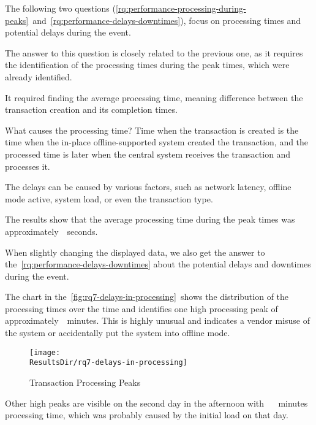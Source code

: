 The following two questions (\autoref{rq:performance-processing-during-peaks}~and~\autoref{rq:performance-delays-downtimes}), focus on processing times and potential delays during the event.


The answer to this question is closely related to the previous one, as it requires the identification of the processing times during the peak times, which were already identified.

It required finding the average processing time, meaning difference between the transaction creation and its completion times.

\begin{infobox}{What causes the processing time?}
	Time when the transaction is created is the time when the in-place offline-supported system created the transaction, and the processed time is later when the central system receives the transaction and processes it.

	The delays can be caused by various factors, such as network latency, offline mode active, system load, or even the transaction type.
\end{infobox}

The results show that the average processing time during the peak times was approximately~~seconds.

When slightly changing the displayed data, we also get the answer to the~\autoref{rq:performance-delays-downtimes} about the potential delays and downtimes during the event.


The chart in the~\autoref{fig:rq7-delays-in-processing}~shows the distribution of the processing times over the time and identifies one high processing peak of approximately~~minutes.
This is highly unusual and indicates a vendor misuse of the system or accidentally put the system into offline mode.

\begin{figure}[H]
	\centering
	\texttt{[image: \\ResultsDir/rq7-delays-in-processing]}
	\caption{Transaction Processing Peaks}
	\label{fig:rq7-delays-in-processing}
	\source
\end{figure}

Other high peaks are visible on the second day in the afternoon with ~ ~minutes processing time, which was probably caused by the initial load on that day.

